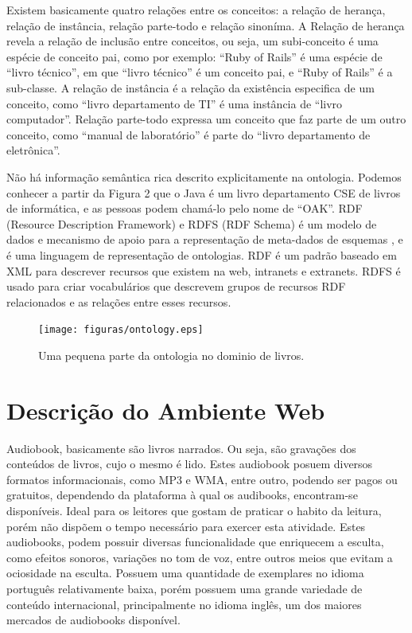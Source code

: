 Existem basicamente quatro relações entre os conceitos: a relação de herança, relação de instância, relação parte-todo e relação sinoníma. A Relação de herança revela a relação de inclusão entre conceitos, ou seja, um subi-conceito é uma espécie de conceito pai, como por exemplo: ``Ruby of Rails'' é uma espécie de ``livro técnico'', em que ``livro técnico'' é um conceito pai, e ``Ruby of Rails'' é a sub-classe. A relação de instância é a relação da existência especifica de um conceito, como ``livro departamento de TI'' é uma instância de ``livro computador''. Relação parte-todo expressa um conceito que faz parte de um outro conceito, como ``manual de laboratório'' é parte do ``livro departamento de eletrônica''.

Não há informação semântica rica descrito explicitamente na ontologia. Podemos conhecer a partir da Figura 2 que o Java é um livro departamento CSE de livros de informática, e as pessoas podem chamá-lo pelo nome de ``OAK''. RDF (Resource Description Framework) e RDFS (RDF Schema) é um modelo de dados e mecanismo de apoio para a representação de meta-dados de esquemas \cite{rdf}, e é uma linguagem de representação de ontologias. RDF é um padrão baseado em XML para descrever recursos que existem na web, intranets e extranets. RDFS é usado para criar vocabulários que descrevem grupos de recursos RDF relacionados e as relações entre esses recursos. 


 \begin{figure}[ht]
	\centering
		\texttt{[image: figuras/ontology.eps]}
	\caption{Uma pequena parte da ontologia no dominio de livros.}
	\label{lanctocalivros}
\end{figure}

\section{Descrição do Ambiente Web}
Audiobook, basicamente são livros narrados. Ou seja, são gravações dos conteúdos de livros, cujo o mesmo é lido. Estes audiobook posuem diversos formatos informacionais, como MP3 e WMA, entre outro, podendo ser pagos ou gratuitos, dependendo da plataforma à qual os audibooks, encontram-se disponíveis.
Ideal para os leitores que gostam de praticar o habito da leitura, porém não dispõem o tempo necessário para exercer esta atividade. Estes audiobooks, podem possuir diversas funcionalidade que enriquecem a esculta, como efeitos sonoros, variações no tom de voz, entre outros meios que evitam a ociosidade na esculta.
Possuem uma quantidade de exemplares no idioma português relativamente baixa, porém possuem uma grande variedade de conteúdo internacional, principalmente no idioma inglês, um dos maiores mercados de audiobooks disponível.


